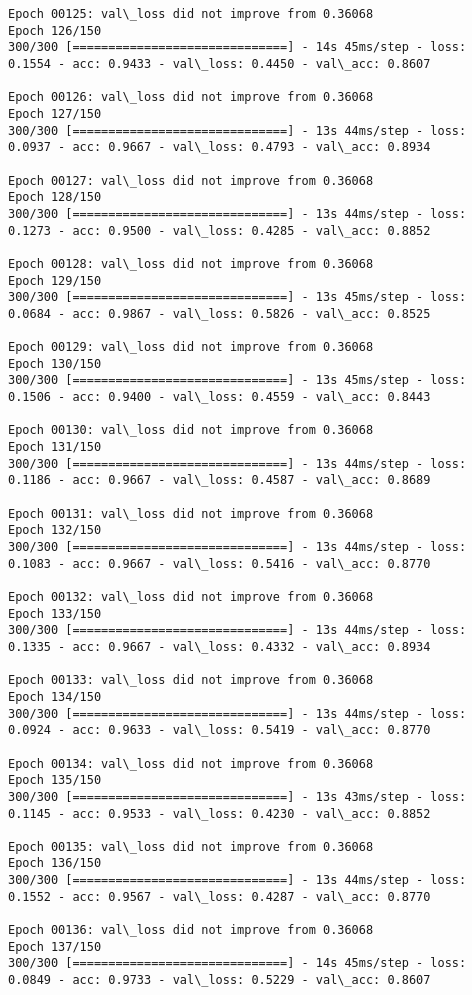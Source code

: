 \documentclass[11pt]{article}
\begin{document}
\begin{Verbatim}[commandchars=\\\{\}]
Epoch 00125: val\_loss did not improve from 0.36068
Epoch 126/150
300/300 [==============================] - 14s 45ms/step - loss: 0.1554 - acc: 0.9433 - val\_loss: 0.4450 - val\_acc: 0.8607

Epoch 00126: val\_loss did not improve from 0.36068
Epoch 127/150
300/300 [==============================] - 13s 44ms/step - loss: 0.0937 - acc: 0.9667 - val\_loss: 0.4793 - val\_acc: 0.8934

Epoch 00127: val\_loss did not improve from 0.36068
Epoch 128/150
300/300 [==============================] - 13s 44ms/step - loss: 0.1273 - acc: 0.9500 - val\_loss: 0.4285 - val\_acc: 0.8852

Epoch 00128: val\_loss did not improve from 0.36068
Epoch 129/150
300/300 [==============================] - 13s 45ms/step - loss: 0.0684 - acc: 0.9867 - val\_loss: 0.5826 - val\_acc: 0.8525

Epoch 00129: val\_loss did not improve from 0.36068
Epoch 130/150
300/300 [==============================] - 13s 45ms/step - loss: 0.1506 - acc: 0.9400 - val\_loss: 0.4559 - val\_acc: 0.8443

Epoch 00130: val\_loss did not improve from 0.36068
Epoch 131/150
300/300 [==============================] - 13s 44ms/step - loss: 0.1186 - acc: 0.9667 - val\_loss: 0.4587 - val\_acc: 0.8689

Epoch 00131: val\_loss did not improve from 0.36068
Epoch 132/150
300/300 [==============================] - 13s 44ms/step - loss: 0.1083 - acc: 0.9667 - val\_loss: 0.5416 - val\_acc: 0.8770

Epoch 00132: val\_loss did not improve from 0.36068
Epoch 133/150
300/300 [==============================] - 13s 44ms/step - loss: 0.1335 - acc: 0.9667 - val\_loss: 0.4332 - val\_acc: 0.8934

Epoch 00133: val\_loss did not improve from 0.36068
Epoch 134/150
300/300 [==============================] - 13s 44ms/step - loss: 0.0924 - acc: 0.9633 - val\_loss: 0.5419 - val\_acc: 0.8770

Epoch 00134: val\_loss did not improve from 0.36068
Epoch 135/150
300/300 [==============================] - 13s 43ms/step - loss: 0.1145 - acc: 0.9533 - val\_loss: 0.4230 - val\_acc: 0.8852

Epoch 00135: val\_loss did not improve from 0.36068
Epoch 136/150
300/300 [==============================] - 13s 44ms/step - loss: 0.1552 - acc: 0.9567 - val\_loss: 0.4287 - val\_acc: 0.8770

Epoch 00136: val\_loss did not improve from 0.36068
Epoch 137/150
300/300 [==============================] - 14s 45ms/step - loss: 0.0849 - acc: 0.9733 - val\_loss: 0.5229 - val\_acc: 0.8607


\end{Verbatim}
\end{document}
